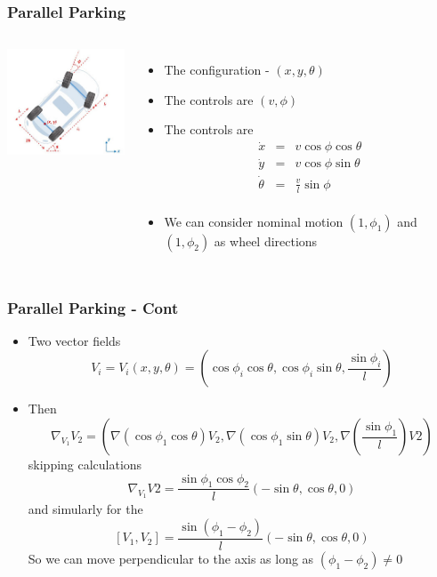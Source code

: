 \documentclass[10pt]{beamer}
\begin{document}
\begin{frame}
  \frametitle{Parallel Parking}
  \begin{columns}
    \column{5cm}
    \vfill
    \centerline{\includegraphics[width=4.9cm]{parallel-parking}}
    \vfill
    \column{6cm}
    \begin{itemize}
    \item The configuration - $(x, y, \theta)$
    \item The controls are $(v, \phi)$
    \item The controls are
      \[
        \begin{array}{rcl}
          \dot{x}& = & v \cos \phi \cos \theta\\
          \dot{y}& = & v \cos \phi \sin \theta\\
          \dot{\theta} & = & \frac{v}{l} \sin \phi\\
        \end{array}
      \]
    \item We can consider nominal motion $(1, \phi_1)$ and $(1, \phi_2)$ as wheel directions
    \end{itemize}
  \end{columns}
\end{frame}
\begin{frame}
  \frametitle{Parallel Parking - Cont}
  \begin{itemize}
    \item Two vector fields
      \[ V_i = V_i(x,y,\theta) =
        (\cos \phi_i \cos\theta, \cos\phi_i \sin\theta, \frac{\sin \phi_i}{l})
      \]
    \item Then
      \[
        \nabla_{V_1} V_2 = (\nabla(\cos\phi_1 \cos \theta) V_2,
        \nabla(\cos \phi_1 \sin \theta) V_2, \nabla(\frac{\sin \phi_1}{l}) V2)
      \] skipping calculations
      \[
        \nabla_{V_1} V2 = \frac{\sin \phi_1 \cos \phi_2}{l}(-\sin \theta, \cos \theta, 0)
      \]  and simularly for the 
      \[
        [V_1, V_2] = \frac{\sin(\phi_1 - \phi_2)}{l} (-\sin \theta, \cos \theta, 0)
      \] So we can move perpendicular to the axis as long as $(\phi_1-\phi_2)\neq 0 $
  \end{itemize}
\end{frame}
\end{document}
